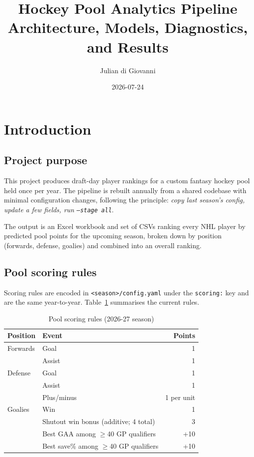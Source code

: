 \documentclass[11pt, a4paper]{article}
\title{\textbf{Hockey Pool Analytics Pipeline}\\[0.4em]
       \large Architecture, Models, Diagnostics, and Results}
\author{Julian di Giovanni}
\date{2026-07-24}
\begin{document}
\maketitle
\tableofcontents
\newpage

\section{Introduction}
\label{sec:intro}

\subsection{Project purpose}

This project produces draft-day player rankings for a custom fantasy hockey pool held once per
year. The pipeline is rebuilt annually from a shared codebase with minimal configuration changes,
following the principle: \emph{copy last season's config, update a few fields, run \texttt{--stage all}}.

The output is an Excel workbook and set of CSVs ranking every NHL player by predicted pool points
for the upcoming season, broken down by position (forwards, defense, goalies) and combined into
an overall ranking.

\subsection{Pool scoring rules}

Scoring rules are encoded in \texttt{<season>/config.yaml} under the \texttt{scoring:} key and
are the same year-to-year. Table~\ref{tab:scoring} summarises the current rules.

\begin{table}[h]
\centering
\caption{Pool scoring rules (2026-27 season)}
\label{tab:scoring}
\begin{tabular}{llr}
\toprule
Position & Event & Points \\
\midrule
Forwards  & Goal                             & 1 \\
          & Assist                           & 1 \\
\midrule
Defense   & Goal                             & 1 \\
          & Assist                           & 1 \\
          & Plus/minus                       & 1 per unit \\
\midrule
Goalies   & Win                              & 1 \\
          & Shutout win bonus (additive; 4 total)& 3 \\
          & Best GAA among $\geq$40 GP qualifiers & +10 \\
          & Best save\% among $\geq$40 GP qualifiers & +10 \\
\bottomrule
\end{tabular}
\end{table}
\end{document}
